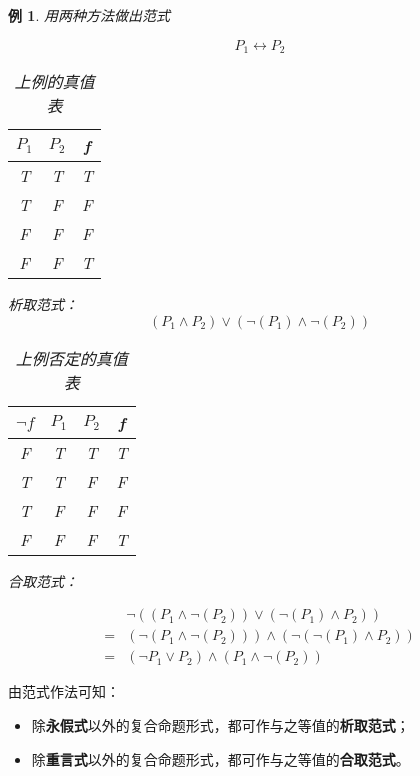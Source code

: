 \documentclass[12pt,onecolumn,a4paper]{book}
\newtheorem*{example}{例}
\numberwithin{table}{subsection}
\numberwithin{equation}{subsection}
\begin{document}
\begin{example}
    用两种方法做出范式

    \begin{equation}
        P_1 \longleftrightarrow P_2
    \end{equation}

    \begin{table}[h]
        \centering
        \begin{tabular}{cc|c}
        $P_1$ & $P_2$ & f \\ \hline
        T     & T     & T \\
        T     & F     & F \\
        F     & F     & F \\
        F     & F     & T
        \end{tabular}
        \caption{上例的真值表}
    \end{table}

    析取范式：
    \begin{equation}
       ( P_1 \wedge P_2 ) \vee ( \neg(P_1) \wedge \neg(P_2))
    \end{equation}

    \begin{table}[h]
        \centering
        \begin{tabular}{c|cc|c}
        $\neg f$ & $P_1$ & $P_2$ & f \\ \hline
        F & T     & T     & T \\
        T & T     & F     & F \\
        T & F     & F     & F \\
        F & F     & F     & T
        \end{tabular}
        \caption{上例否定的真值表}
    \end{table}

    合取范式：

    \begin{align}
        &\neg(( P_1 \wedge \neg(P_2) ) \vee ( \neg(P_1) \wedge P_2)) \\
        = &(\neg( P_1 \wedge \neg(P_2) )) \wedge ( \neg(\neg(P_1) \wedge P_2)) \\
        = &(\neg P_1 \vee P_2 ) \wedge ( P_1 \wedge \neg(P_2))
    \end{align}
        
\end{example}

由范式作法可知：
\begin{itemize}[itemsep=0pt,parsep=0pt]
    \item 除\textbf{永假式}以外的复合命题形式，都可作与之等值的\textbf{析取范式}；
    \item 除\textbf{重言式}以外的复合命题形式，都可作与之等值的\textbf{合取范式}。
\end{itemize}
\end{document}
